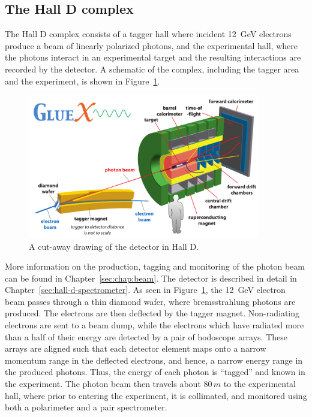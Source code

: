 \subsection[The Hall D complex]{The Hall D complex \label{sec:gluexexperiment:complex}}
The Hall D complex consists of a tagger hall where incident 12~GeV electrons produce
a beam of linearly polarized photons, and the experimental hall, where the photons interact
in an experimental target and the resulting interactions are recorded by the \GX{} detector.
A schematic of the complex, including the tagger area and the \GX{} experiment, is shown 
in Figure~\ref{fig:gluex_schematic}.
\begin{figure}[h!]\centering
\includegraphics[width=0.9\textwidth]{figures/GlueX_detector_labels_noplug}
\caption[]{\label{fig:gluex_schematic}A cut-away drawing of the \GX{} detector in Hall D.}
\end{figure}
More information on the production, tagging and monitoring of the photon beam can be found in
Chapter~\ref{sec:chap:beam}. The \GX{} detector is described in detail in 
Chapter~\ref{sec:hall-d-spectrometer}.
\label{sec:intro:detector}
As seen in Figure~\ref{fig:gluex_schematic}, the 12~GeV electron beam passes through a 
thin diamond wafer, where bremsstrahlung photons are produced. The electrons are then deflected
by the tagger magnet. Non-radiating electrons are sent to a beam dump, while the electrons which
have radiated more than a half of their energy
are detected by a pair of hodoscope arrays. These arrays are aligned such that each detector element
maps onto a narrow momentum range in the deflected electrons, and hence, a narrow energy range
in the produced photons. Thus, the energy of each photon is ``tagged'' and known in  the experiment.
The photon beam then travels about $80\, m$ to the experimental hall, where prior to entering the
experiment, it is collimated, and monitored using both a polarimeter and a pair spectrometer.

